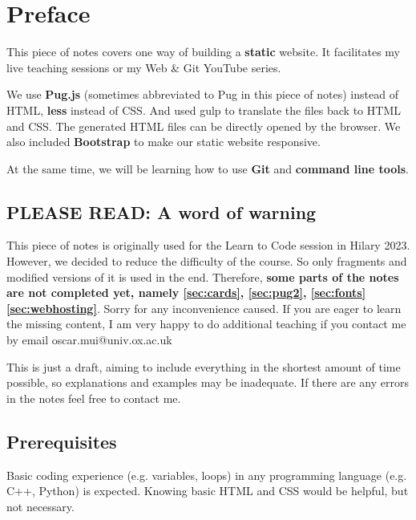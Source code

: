 \chapter*{Preface}

This piece of notes covers one way of building a \textbf{static} website. It facilitates my live teaching sessions or my Web \& Git YouTube series.
\vspace{6mm}

We use \textbf{Pug.js} (sometimes abbreviated to Pug in this piece of notes) instead of HTML, \textbf{less} instead of CSS. And used gulp to translate the files back to HTML and CSS. The generated HTML files can be directly opened by the browser. We also included \textbf{Bootstrap} to make our static website responsive.
\vspace{6mm}

At the same time, we will be learning how to use \textbf{Git} and \textbf{command line tools}.

\section{PLEASE READ: A word of warning}
\label{sec:incompletewarning}
This piece of notes is originally used for the Learn to Code session in Hilary 2023. However, we decided to reduce the difficulty of the course. So only fragments and modified versions of it is used in the end. Therefore, \textbf{some parts of the notes are not completed yet, namely \cref{sec:cards}, \cref{sec:pug2}, \cref{sec:fonts} \cref{sec:webhosting}}. Sorry for any inconvenience caused. If you are eager to learn the missing content, I am very happy to do additional teaching if you contact me by email oscar.mui@univ.ox.ac.uk

This is just a draft, aiming to include everything in the shortest amount of time possible, so explanations and examples may be inadequate. If there are any errors in the notes feel free to contact me.

\section{Prerequisites}

Basic coding experience (e.g. variables, loops) in any programming language (e.g. C++, Python) is expected. Knowing basic HTML and CSS would be helpful, but not necessary. 

